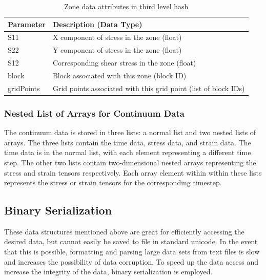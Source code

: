 \begin{table}[!htb]
\centering
\caption{Zone data attributes in third level hash}
\label{tab:keys6}
\begin{tabularx}{\textwidth}{@{}Yp{0.75\textwidth}@{}}
\toprule
\textbf{Parameter} & \textbf{Description (Data Type)}                                \\ \midrule
S11                & X component of stress in the zone (float)                       \\
S22                & Y component of stress in the zone (float)                       \\
S12                & Corresponding shear stress in the zone (float)                  \\
block              & Block associated with this zone (block ID)                      \\
gridPoints         & Grid points associated with this grid point (list of block IDs)\\ \bottomrule
\end{tabularx}
\end{table}

\subsubsection*{Nested List of Arrays for Continuum Data}

The continuum data is stored in three lists: a normal list and two nested lists of arrays. The three lists contain the time data, stress data, and strain data. The time data is in the normal list, with each element representing a different time step. The other two lists contain two-dimensional nested arrays representing the stress and strain tensors respectively. Each array element within within these lists represents the stress or strain tensors for the corresponding timestep.

\subsection{Binary Serialization}

These data structures mentioned above are great for efficiently accessing the desired data, but cannot easily be saved to file in standard unicode. In the event that this is possible, formatting and parsing large data sets from text files is slow and increases the possibility of data corruption. To speed up the data access and increase the integrity of the data, binary serialization is employed. 

